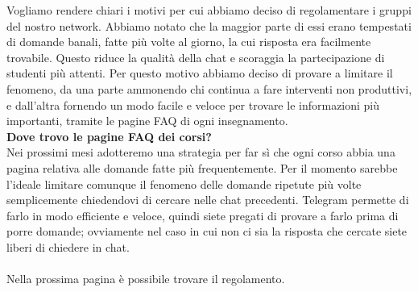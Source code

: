 \documentclass[a4paper, 11pt, oneside, article]{book} %
\begin{document}
Vogliamo rendere chiari i motivi per cui abbiamo deciso di regolamentare i gruppi del nostro network.
Abbiamo notato che la maggior parte di essi erano tempestati di domande banali, fatte più volte al giorno, la cui risposta era facilmente trovabile. 
Questo riduce la qualità della chat e scoraggia la partecipazione di studenti più attenti. Per questo motivo abbiamo deciso di provare a limitare il fenomeno, 
da una parte ammonendo chi continua a fare interventi non produttivi, e dall'altra fornendo un modo facile e veloce per trovare le informazioni più importanti, 
tramite le pagine FAQ di ogni insegnamento.\\

\textbf{Dove trovo le pagine FAQ dei corsi?}\\

Nei prossimi mesi adotteremo una strategia per far sì che ogni corso abbia una pagina relativa alle domande fatte più frequentemente.
Per il momento sarebbe l'ideale limitare comunque il fenomeno delle domande ripetute più volte semplicemente chiedendovi di cercare nelle chat precedenti.
Telegram permette di farlo in modo efficiente e veloce, quindi siete pregati di provare a farlo prima di porre domande; ovviamente nel caso in cui non ci sia la risposta che cercate siete liberi di chiedere in chat.\\\\
Nella prossima pagina è possibile trovare il regolamento.

\newpage
\end{document}
